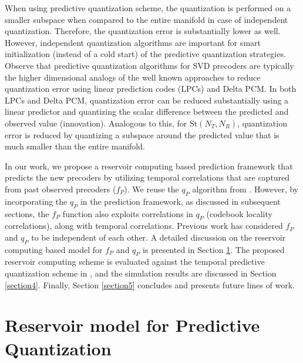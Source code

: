 \documentclass[conference]{IEEEtran}
\begin{document}
When using predictive quantization scheme, the quantization is performed on a smaller subspace when compared to the entire manifold in case of independent quantization.
Therefore, the quantization error is substantially lower as well.
However, independent quantization algorithms are important for smart initialization (instead of a cold start) of the predictive quantization strategies.
Observe that predictive quantization algorithms for SVD precoders are typically the higher dimensional analogs of the well known approaches to reduce quantization error using linear prediction codes (LPCs) and Delta PCM.
In both LPCs and Delta PCM, quantization error can be reduced substantially using a linear predictor and quantizing the scalar difference between the predicted and observed value (innovation).
Analogous to this, for $\text{St}(N_T,N_R)$, quantization error is reduced by quantizing a subspace around the predicted value that is much smaller than the entire manifold.

In our work, we propose a reservoir computing based prediction framework that predicts the new precoders by utilizing  temporal correlations that are captured from past observed precoders ($f_P$).
We reuse the $q_P$ algorithm from \cite{Gupt1905:Predictive,6891198}.
However, by incorporating the $q_P$ in the prediction framework, as discussed in subsequent sections, the $f_P$ function also exploits correlations in $q_P$ (codebook locality correlations), along with temporal correlations.
Previous work \cite{Gupt1905:Predictive,6891198} has considered $f_P$ and $q_P$ to be independent of each other.
A detailed discussion on the reservoir computing based model for $f_P$ and $q_P$ is presented in Section \ref{section3}.
The proposed reservoir computing scheme is evaluated against the temporal predictive quantization scheme in \cite{6891198}, and the simulation results are discussed in Section \ref{section4}. Finally, Section \ref{section5} concludes and presents future lines of work.

\section{Reservoir model for Predictive Quantization}
\label{section3}
\end{document}

